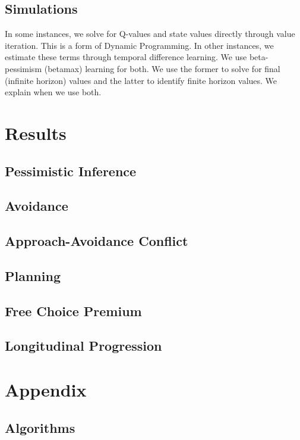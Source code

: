 \documentclass[11pt]{article} %
\begin{document}
\subsection{Simulations}

In some instances, we solve for Q-values and state values directly through value
iteration. This is a form of Dynamic Programming. In other instances, we estimate
these terms through temporal difference learning. We use beta-pessimism (betamax)
learning for both. We use the former to solve for final (infinite horizon) values
and the latter to identify finite horizon values. We explain when we use both.

\section{Results}

\subsection{Pessimistic Inference}

\subsection{Avoidance}

\subsection{Approach-Avoidance Conflict}

\subsection{Planning}

\subsection{Free Choice Premium}

\subsection{Longitudinal Progression}


\section{Appendix}
\subsection{Algorithms}
\end{document}
